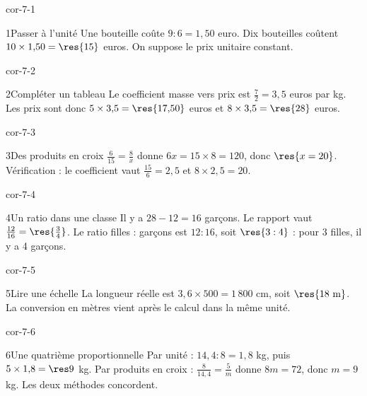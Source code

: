 \clearpage\pagestyle{otMain}\setlength{\otBlocEspacement}{2.5mm}\fontsize{11}{15}\selectfont{}
\begin{blocLivre}{cor-7-1}\begin{corrige}{1}{Passer à l’unité}
Une bouteille coûte $9:6=1{,}50$ euro. Dix bouteilles coûtent $10\times1{,}50=\res{15}$ euros. On suppose le prix unitaire constant.
\end{corrige}\end{blocLivre}
\begin{blocLivre}{cor-7-2}\begin{corrige}{2}{Compléter un tableau}
Le coefficient masse vers prix est $\frac72=3{,}5$ euros par kg. Les prix sont donc $5\times3{,}5=\res{17{,}50}$ euros et $8\times3{,}5=\res{28}$ euros.
\end{corrige}\end{blocLivre}
\begin{blocLivre}{cor-7-3}\begin{corrige}{3}{Des produits en croix}
$\frac6{15}=\frac8x$ donne $6x=15\times8=120$, donc $\res{x=20}$. Vérification : le coefficient vaut $\frac{15}6=2{,}5$ et $8\times2{,}5=20$.
\end{corrige}\end{blocLivre}
\begin{blocLivre}{cor-7-4}\begin{corrige}{4}{Un ratio dans une classe}
Il y a $28-12=16$ garçons. Le rapport vaut $\frac{12}{16}=\res{\frac34}$. Le ratio filles : garçons est $12:16$, soit $\res{3:4}$ : pour 3 filles, il y a 4 garçons.
\end{corrige}\end{blocLivre}
\begin{blocLivre}{cor-7-5}\begin{corrige}{5}{Lire une échelle}
La longueur réelle est $3{,}6\times500=1\,800$ cm, soit $\res{18\ \mathrm m}$. La conversion en mètres vient après le calcul dans la même unité.
\end{corrige}\end{blocLivre}
\begin{blocLivre}{cor-7-6}\begin{corrige}{6}{Une quatrième proportionnelle}
Par unité : $14{,}4:8=1{,}8$ kg, puis $5\times1{,}8=\res9$ kg. Par produits en croix : $\frac8{14{,}4}=\frac5m$ donne $8m=72$, donc $m=9$ kg. Les deux méthodes concordent.
\end{corrige}\end{blocLivre}
